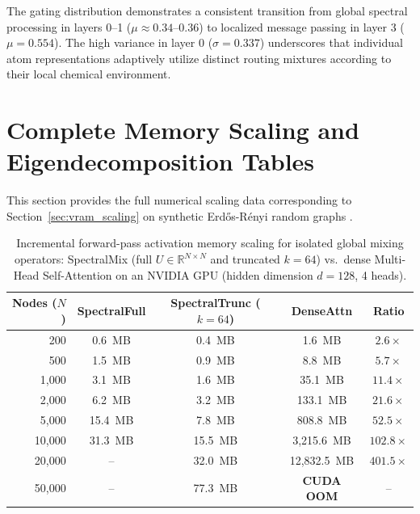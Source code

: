 \documentclass[10pt]{article}
\begin{document}
The gating distribution demonstrates a consistent transition from global spectral processing in layers 0--1 ($\mu \approx 0.34$--$0.36$) to localized message passing in layer 3 ($\mu = 0.554$). The high variance in layer 0 ($\sigma = 0.337$) underscores that individual atom representations adaptively utilize distinct routing mixtures according to their local chemical environment.

\section{Complete Memory Scaling and Eigendecomposition Tables}
\label{app:vram_tables}

This section provides the full numerical scaling data corresponding to Section~\ref{sec:vram_scaling} on synthetic Erd\H{o}s-R\'enyi random graphs \citep{erdos1959random}.

\begin{table}[!htbp]
\caption{Incremental forward-pass activation memory scaling for isolated global mixing operators: SpectralMix (full $U \in \mathbb{R}^{N \times N}$ and truncated $k=64$) vs.\ dense Multi-Head Self-Attention on an NVIDIA GPU (hidden dimension $d=128$, 4 heads).}
\label{tab:vram_scaling}
\centering
\begin{tabular}{rcccc}
\toprule
\textbf{Nodes ($N$)} & \textbf{SpectralFull} & \textbf{SpectralTrunc ($k{=}64$)} & \textbf{DenseAttn} & \textbf{Ratio} \\
\midrule
200    & 0.6~MB  & 0.4~MB  & 1.6~MB      & $2.6\times$ \\
500    & 1.5~MB  & 0.9~MB  & 8.8~MB      & $5.7\times$ \\
1,000  & 3.1~MB  & 1.6~MB  & 35.1~MB     & $11.4\times$ \\
2,000  & 6.2~MB  & 3.2~MB  & 133.1~MB    & $21.6\times$ \\
5,000  & 15.4~MB & 7.8~MB  & 808.8~MB    & $52.5\times$ \\
10,000 & 31.3~MB & 15.5~MB & 3,215.6~MB  & $102.8\times$ \\
20,000 & --      & 32.0~MB & 12,832.5~MB & $401.5\times$ \\
50,000 & --      & 77.3~MB & \textbf{CUDA OOM} & -- \\
\bottomrule
\end{tabular}
\end{table}
\end{document}

